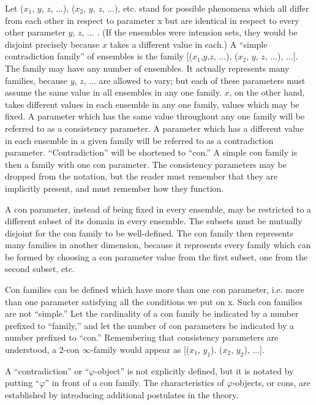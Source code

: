 Let ($x_1$, $y$, $z$, ...), ($x_2$, $y$, $z$, ...), etc. stand for possible phenomena 
which all differ from each other in respect to parameter x but are identical in 
respect to every other parameter $y$, $z$, ... . (If the ensembles were intension 
sets, they would be disjoint precisely because $x$ takes a different value in 
each.) A \enquote{simple contradiction family} of ensembles is the family [($x_1$,$y$,$z$, 
...), ($x_2$, $y$, $z$, ...), ...]. The family may have any number of ensembles. It 
actually represents many families, because $y$, $z$, ... are allowed to vary; but 
each of these parameters must assume the same value in all ensembles in any 
one family. $x$, on the other hand, takes different values in each ensemble in 
any one family, values which may be fixed. A parameter which has the same 
value throughout any one family will be referred to as a consistency 
parameter. A parameter which has a different value in each ensemble in a 
given family will be referred to as a contradiction parameter. 
\enquote{Contradiction} will be shortened to \enquote{con.} A simple con family is then a 
family with one con parameter. The consistency parameters may be dropped 
from the notation, but the reader must remember that they are implicitly 
present, and must remember how they function. 

A con parameter, instead of being fixed in every ensemble, may be 
restricted to a different subset of its domain in every ensemble. The subsets 
must be mutually disjoint for the con family to be well-defined. The con 
family then represents many families in another dimension, because it 
represents every family which can be formed by choosing a con parameter 
value from the first subset, one from the second subset, etc. 

Con families can be defined which have more than one con parameter, 
i.e. more than one parameter satisfying all the conditions we put on x. Such 
con families are not \enquote{simple.} Let the cardinality of a con family be 
indicated by a number prefixed to \enquote{family,} and let the number of con 
parameters be indicated by a number prefixed to \enquote{con.} Remembering that 
consistency parameters are understood, a 2-con $\infty$-family would appear as 
[($x_1$, $y_1$). ($x_2$, $y_2$), ...].

A \enquote{contradiction} or \enquote{$\varphi$-object} is not explicitly defined, but it is 
notated by putting \enquote{$\varphi$} in front of a con family. The characteristics of $\varphi$-objects, 
or cons, are established by introducing additional postulates in the 
theory. 

